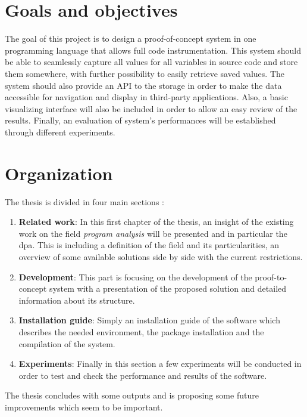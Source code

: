 \section{Goals and objectives}
The goal of this project is to design a proof-of-concept system in one programming language that allows full code instrumentation. This system should be able to seamlessly capture all values for all variables in source code and store them somewhere, with further possibility to easily retrieve saved values. The system should also provide an API to the storage in order to make the data accessible for navigation and display in third-party applications. Also, a basic visualizing interface will also be included in order to allow an easy review of the results. Finally, an evaluation of system's performances will be established through different experiments.

\section{Organization}
The thesis is divided in four main sections :
\begin{enumerate}
  \item \textbf{Related work}: In this first chapter of the thesis, an insight of the existing work on the field \textit{program analysis} will be presented and in particular the \gls{dpa}. This is including a definition of the field and its particularities, an overview of some available solutions side by side with the current restrictions.
  \item \textbf{Development}: This part is focusing on the development of the proof-to-concept system with a presentation of the proposed solution and detailed information about its structure.
  \item \textbf{Installation guide}: Simply an installation guide of the software which describes the needed environment, the package installation and the compilation of the system.
  \item \textbf{Experiments}: Finally in this section a few experiments will be conducted in order to test and check the performance and results of the software.
\end{enumerate}
The thesis concludes with some outputs and is proposing some future improvements which seem to be important.
